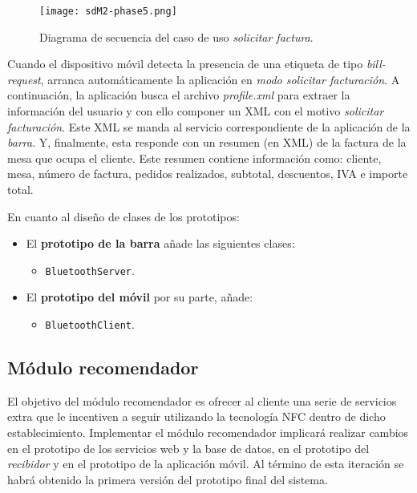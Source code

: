 \begin{itemize}
  \begin{sidewaysfigure}[h]
    \begin{center}
      \texttt{[image: sdM2-phase5.png]}
      \caption{Diagrama de secuencia del caso de uso \emph{solicitar factura}.}
      \label{fig:sdM2-phase5}
    \end{center}
  \end{sidewaysfigure}

Cuando el dispositivo móvil detecta la presencia de una etiqueta de tipo
\emph{bill-request}, arranca automáticamente la aplicación en \emph{modo
solicitar facturación}. A continuación, la aplicación busca el archivo
\emph{profile.xml} para extraer la información del usuario y con ello componer
un \acs{XML} con el motivo \emph{solicitar facturación}. Este \acs{XML} se
manda al servicio correspondiente de la aplicación de la \emph{barra}. Y,
finalmente, esta responde con un resumen (en \acs{XML}) de la factura de la 
mesa que ocupa el cliente. Este resumen contiene información como: cliente, 
mesa, número de factura, pedidos realizados, subtotal, descuentos, IVA e
importe total.
\end{itemize}

En cuanto al diseño de clases de los prototipos:
\begin{itemize}
\item El \textbf{prototipo de la barra} añade las siguientes clases:
  \begin{itemize}
  \item \texttt{BluetoothServer}. %
  \end{itemize}
\item El \textbf{prototipo del móvil} por su parte, añade:
  \begin{itemize}
  \item \texttt{BluetoothClient}. %
  \end{itemize}
\end{itemize}

\subsection{Módulo recomendador}
El objetivo del módulo recomendador es ofrecer al cliente una serie de
servicios extra que le incentiven a seguir utilizando la tecnología \acs{NFC}
dentro de dicho establecimiento. Implementar el módulo recomendador implicará
realizar cambios en el prototipo de los servicios web y la base de datos, en
el prototipo del \emph{recibidor} y en el prototipo de la aplicación móvil.
Al término de esta iteración se habrá obtenido la primera versión del prototipo
final del sistema.


